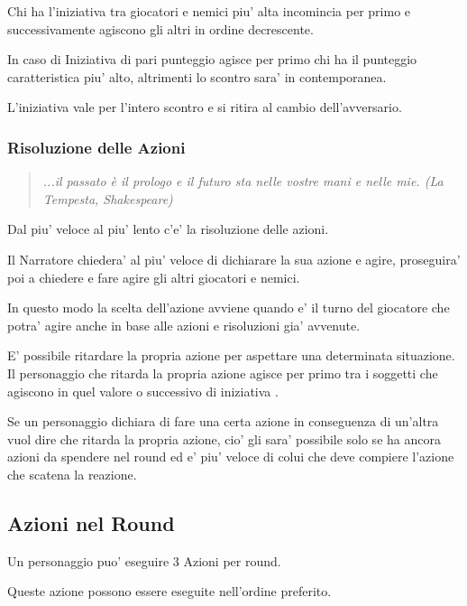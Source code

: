 \documentclass[a4paper,11pt,twoside,openany]{book}
\begin{document}
Chi ha l'iniziativa tra giocatori e nemici piu' alta incomincia per primo e successivamente agiscono gli altri in ordine decrescente. 

In caso di Iniziativa di pari punteggio agisce per primo chi ha il punteggio caratteristica piu' alto, altrimenti lo scontro sara' in contemporanea.

L'iniziativa vale per l'intero scontro e si ritira al cambio dell'avversario.

\subsubsection{Risoluzione delle Azioni}

\begin{quote}\textit{
...il passato è il prologo e il futuro sta nelle vostre mani e nelle mie. (La Tempesta, Shakespeare)
}\end{quote}


\label{risoluzione-delle-azioni}

Dal piu' veloce al piu' lento c'e' la risoluzione delle azioni.

Il Narratore chiedera' al piu' veloce di dichiarare la sua azione e agire, proseguira' poi a chiedere e fare agire gli altri giocatori e nemici.

In questo modo la scelta dell'azione avviene quando e' il turno del giocatore che potra' agire anche in base alle azioni e risoluzioni gia' avvenute.

E' possibile ritardare la propria azione per aspettare una determinata situazione. Il personaggio che ritarda la propria azione agisce per primo tra i soggetti che agiscono in quel valore o successivo di iniziativa .

Se un personaggio dichiara di fare una certa azione in conseguenza di un'altra vuol dire che ritarda la propria azione, cio' gli sara' possibile solo se ha ancora azioni da spendere nel round ed e' piu' veloce di colui che deve compiere l'azione che scatena la reazione.

\subsection{Azioni nel Round}

\label{azioni-nel-round}

Un personaggio puo' eseguire 3 Azioni per round.

Queste azione possono essere eseguite nell'ordine preferito.
\end{document}
